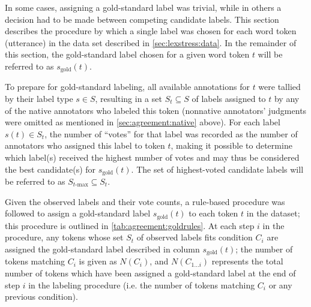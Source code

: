 		In some cases, assigning a gold-standard label was trivial, while in others a decision had to be made between competing candidate labels. This section describes the procedure by which a single label was chosen for each word token (utterance) in the data set described in \cref{sec:lexstress:data}. In the remainder of this section, the gold-standard label chosen for a given word token $t$ will be referred to as $s_{\text{gold}}(t)$.
		
		To prepare for gold-standard labeling, all available annotations for $t$ were tallied by their label type $s \in S$, resulting in a set $S_t \subseteq S$ of labels assigned to $t$ by any of the native annotators who labeled this token (nonnative annotators' judgments were omitted as mentioned in \cref{sec:agreement:native} above). For each label $s(t) \in S_t$, the number of ``votes'' for that label was recorded as the number of annotators who assigned this label to token $t$,
		making it possible to determine which label(s) received the highest number of votes and may thus be considered the best candidate(s) for $s_{\text{gold}}(t)$. The set of highest-voted candidate labels will be referred to as $S_{t\text{-max}} \subseteq S_t$.
		
		Given the observed labels and their vote counts, a rule-based procedure was followed to assign a gold-standard label $s_{\text{gold}}(t)$ to each token $t$ in the dataset; this procedure is outlined in \cref{tab:agreement:goldrules}. At each step $i$ in the procedure, any tokens whose set $S_t$ of observed labels fits condition $C_i$ are assigned the gold-standard label described in column $s_{\text{gold}}(t)$; the number of tokens matching $C_i$ is given as $N(C_i)$, and 
		$N(C_{1 \dots i})$ represents the total number of tokens which have been assigned a gold-standard label at the end of step $i$ in the labeling procedure (i.e. the number of tokens matching $C_i$ or any previous condition).
		
		

